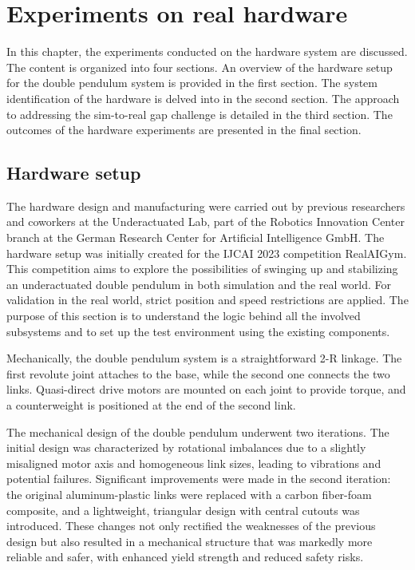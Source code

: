 \chapter{Experiments on real hardware}
In this chapter, the experiments conducted on the hardware system are discussed. The content is organized into four sections. An overview of the hardware setup for the double pendulum system is provided in the first section. The system identification of the hardware is delved into in the second section. The approach to addressing the sim-to-real gap challenge is detailed in the third section. The outcomes of the hardware experiments are presented in the final section.

\section{Hardware setup}
The hardware design and manufacturing were carried out by previous researchers and coworkers at the Underactuated Lab, part of the Robotics Innovation Center branch at the German Research Center for Artificial Intelligence GmbH. The hardware setup was initially created for the IJCAI 2023 competition RealAIGym\cite{dfki_ric_underactuated_lab_2023}. This competition aims to explore the possibilities of swinging up and stabilizing an underactuated double pendulum in both simulation and the real world. For validation in the real world, strict position and speed restrictions are applied. The purpose of this section is to understand the logic behind all the involved subsystems and to set up the test environment using the existing components.

Mechanically, the double pendulum system is a straightforward 2-R linkage. The first revolute joint attaches to the base, while the second one connects the two links. Quasi-direct drive motors are mounted on each joint to provide torque, and a counterweight is positioned at the end of the second link.

The mechanical design of the double pendulum underwent two iterations. The initial design was characterized by rotational imbalances due to a slightly misaligned motor axis and homogeneous link sizes, leading to vibrations and potential failures. Significant improvements were made in the second iteration: the original aluminum-plastic links were replaced with a carbon fiber-foam composite, and a lightweight, triangular design with central cutouts was introduced. These changes not only rectified the weaknesses of the previous design but also resulted in a mechanical structure that was markedly more reliable and safer, with enhanced yield strength and reduced safety risks.

